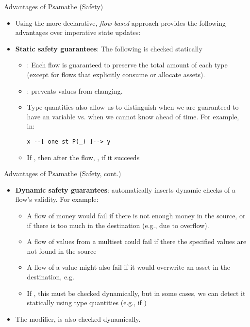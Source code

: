 \documentclass[leqno,presentation,usenames,dvipsnames]{beamer}
\begin{document}
\begin{frame}[fragile]{Advantages of Psamathe (Safety)}
    \begin{itemize}
        \item Using the more declarative, \emph{flow-based} approach provides the following advantages over imperative state updates:
        \item \textbf{Static safety guarantees}: The following is checked statically
            \begin{itemize}
                \item {}: Each flow is guaranteed to preserve the total amount of each  type (except for flows that explicitly consume or allocate assets). %
                \item {}: prevents values from changing.
                \item Type quantities also allow us to distinguish when we are guaranteed to have an  variable vs. when we cannot know ahead of time.
                    For example, in:
\begin{lstlisting}[language=flow, xleftmargin=0.4em, basicstyle=\footnotesize\ttfamily]
x --[ one st P(_) ]--> y
\end{lstlisting}
                \item If , then after the flow, , if it succeeds
            \end{itemize}
    \end{itemize}
\end{frame}

\begin{frame}[fragile]{Advantages of Psamathe (Safety, cont.)}
    \begin{itemize}
        \item \textbf{Dynamic safety guarantees}: \langName automatically inserts dynamic checks of a flow's validity. For example:
        \begin{itemize}
            \item A flow of money would fail if there is not enough money in the source, or if there is too much in the destination (e.g., due to overflow).
            \item A flow of values from a multiset could fail if there the specified values are not found in the source
            \item A flow of a value might also fail if it would overwrite an asset in the destination, e.g. 
            \item If , this must be checked dynamically, but in some cases, we can detect it statically using type quantities (e.g., if )
        \end{itemize}
        \item The  modifier, is also checked dynamically.
    \end{itemize}
\end{frame}
\end{document}
